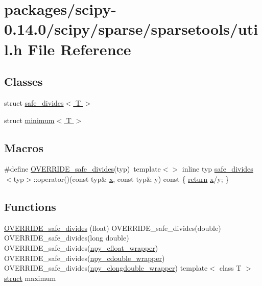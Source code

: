 \hypertarget{scipy-0_814_80_2scipy_2sparse_2sparsetools_2util_8h}{}\section{packages/scipy-\/0.14.0/scipy/sparse/sparsetools/util.h File Reference}
\label{scipy-0_814_80_2scipy_2sparse_2sparsetools_2util_8h}
\subsection*{Classes}
\begin{DoxyCompactItemize}
\item 
struct \hyperlink{structsafe__divides}{safe\+\_\+divides$<$ T $>$}
\item 
struct \hyperlink{structminimum}{minimum$<$ T $>$}
\end{DoxyCompactItemize}
\subsection*{Macros}
\begin{DoxyCompactItemize}
\item 
\#define \hyperlink{scipy-0_814_80_2scipy_2sparse_2sparsetools_2util_8h_a06d3a5c5775f0854fa4bdba30914306b}{O\+V\+E\+R\+R\+I\+D\+E\+\_\+safe\+\_\+divides}(typ)~template$<$$>$ inline typ \hyperlink{structsafe__divides}{safe\+\_\+divides}$<$typ$>$\+::operator()(const typ\& \hyperlink{vecnorm1_8cc_ac73eed9e41ec09d58f112f06c2d6cb63}{x}, const typ\& y) const \{ \hyperlink{stencilops_8h_afee67e5c8680c1bb9a8cb7bef7bfcc55}{return} \hyperlink{vecnorm1_8cc_ac73eed9e41ec09d58f112f06c2d6cb63}{x}/y; \}
\end{DoxyCompactItemize}
\subsection*{Functions}
\begin{DoxyCompactItemize}
\item 
\hyperlink{scipy-0_814_80_2scipy_2sparse_2sparsetools_2util_8h_ac5a50a7b9bd1f8b21fbfb7ea24fdcd9f}{O\+V\+E\+R\+R\+I\+D\+E\+\_\+safe\+\_\+divides} (float) O\+V\+E\+R\+R\+I\+D\+E\+\_\+safe\+\_\+divides(double) O\+V\+E\+R\+R\+I\+D\+E\+\_\+safe\+\_\+divides(long double) O\+V\+E\+R\+R\+I\+D\+E\+\_\+safe\+\_\+divides(\hyperlink{complex__ops_8h_a6b2b0e3493bb891882e75032013392f0}{npy\+\_\+cfloat\+\_\+wrapper}) O\+V\+E\+R\+R\+I\+D\+E\+\_\+safe\+\_\+divides(\hyperlink{complex__ops_8h_a26c821bdad3deaf0af01231890706b37}{npy\+\_\+cdouble\+\_\+wrapper}) O\+V\+E\+R\+R\+I\+D\+E\+\_\+safe\+\_\+divides(\hyperlink{complex__ops_8h_ae1916ba889a475368f902cc8864fde44}{npy\+\_\+clongdouble\+\_\+wrapper}) template$<$ class T $>$ \hyperlink{gen__mat5files_8m_aa5a86657308844fba3fe81ef5286ca5f}{struct} maximum
\end{DoxyCompactItemize}


